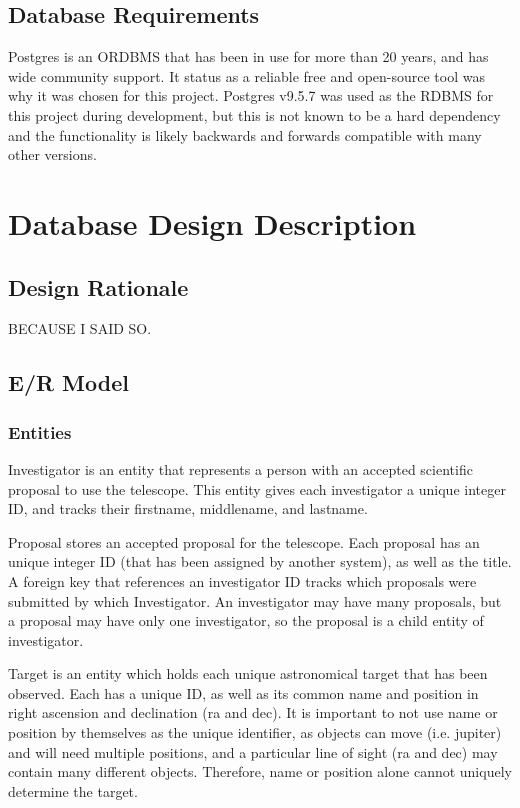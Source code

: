 \documentclass[a4paper,11pt]{article}
\begin{document}
\subsection{Database Requirements}
Postgres is an ORDBMS that has been in use for more than 20 years, and has wide community support.  It status as a reliable free and open-source tool was why it was chosen for this project.  Postgres v9.5.7 was used as the RDBMS for this project during development, but this is not known to be a hard dependency and the functionality is likely backwards and forwards compatible with many other versions.

\section{Database Design Description}
\subsection{Design Rationale}
BECAUSE I SAID SO.

\subsection{E/R Model}
\subsubsection{Entities}
Investigator is an entity that represents a person with an accepted scientific proposal to use the telescope.  This entity gives each investigator a unique integer ID, and tracks their firstname, middlename, and lastname.

Proposal stores an accepted proposal for the telescope.  Each proposal has an unique integer ID (that has been assigned by another system), as well as the title.  A foreign key that references an investigator ID tracks which proposals were submitted by which Investigator.  An investigator may have many proposals, but a proposal may have only one investigator, so the proposal is a child entity of investigator.

Target is an entity which holds each unique astronomical target that has been observed.  Each has a unique ID, as well as its common name and position in right ascension and declination (ra and dec).  It is important to not use name or position by themselves as the unique identifier, as objects can move (i.e. jupiter) and will need multiple positions, and a particular line of sight (ra and dec) may contain many different objects.  Therefore, name or position alone cannot uniquely determine the target.   
\end{document}
